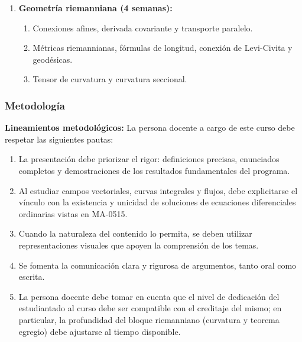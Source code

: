 \begin{refsection}
\begin{enumerate}
\item \textbf{Geometría riemanniana (4 semanas):}
\begin{enumerate}
    \item Conexiones afines, derivada covariante y transporte paralelo.
    \item Métricas riemannianas, fórmulas de longitud, conexión de Levi-Civita y geodésicas.
    \item Tensor de curvatura y curvatura seccional.
\end{enumerate}

\end{enumerate}

\subsubsection*{Metodología}

\noindent \textbf{Lineamientos metodológicos:} La persona docente a cargo de este curso debe respetar las siguientes pautas:
\begin{enumerate}
    \item La presentación debe priorizar el rigor: definiciones precisas, enunciados completos y demostraciones de los resultados fundamentales del programa.
    \item Al estudiar campos vectoriales, curvas integrales y flujos, debe explicitarse el vínculo con la existencia y unicidad de soluciones de ecuaciones diferenciales ordinarias vistas en MA-0515.
    \item Cuando la naturaleza del contenido lo permita, se deben utilizar representaciones visuales que apoyen la comprensión de los temas.
    \item Se fomenta la comunicación clara y rigurosa de argumentos, tanto oral como escrita.
    \item La persona docente debe tomar en cuenta que el nivel de dedicación del estudiantado al curso debe ser compatible con el creditaje del mismo; en particular, la profundidad del bloque riemanniano (curvatura y teorema egregio) debe ajustarse al tiempo disponible.
\end{enumerate}


\end{refsection}
